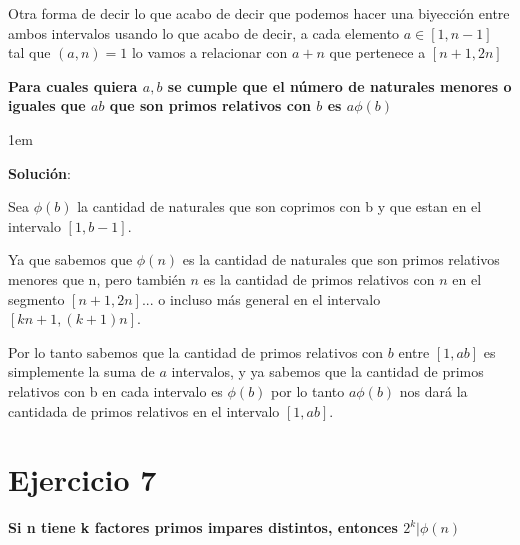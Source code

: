 \documentclass[12pt, fleqn]{article}                             %
\newenvironment{SmallIndentation}[1][0.75em]                    %
    {\begin{adjustwidth}{#1}{}\begin{footnotesize}}                 %
    {\end{footnotesize}\end{adjustwidth}}                           %
\begin{document}
        Otra forma de decir lo que acabo de decir que podemos hacer una biyección entre ambos
        intervalos usando lo que acabo de decir, a cada elemento $a \in [1, n-1]$ tal que $(a, n) = 1$
        lo vamos a relacionar con $a+n$ que pertenece a $[n+1, 2n]$

    \textbf{Para cuales quiera $a, b$ se cumple que el número de naturales menores o iguales que $ab$
    que son primos relativos con $b$ es $a \phi(b)$}

    \begin{SmallIndentation}[1em]
        \textbf{Solución}:
        
        Sea $\phi(b)$ la cantidad de naturales que son coprimos con b y que estan en el intervalo
        $[1, b-1]$.

        Ya que sabemos que $\phi(n)$ es la cantidad de naturales que son primos relativos menores
        que n, pero también $n$ es la cantidad de primos relativos con $n$ en el
        segmento $[n+1, 2n]$... o incluso más general en el intervalo $[kn+1, (k+1)n]$.

        Por lo tanto sabemos que la cantidad de primos relativos con $b$ entre $[1, ab]$ es
        simplemente la suma de $a$ intervalos, y ya sabemos que la cantidad de primos relativos
        con b en cada intervalo es $\phi(b)$ por lo tanto $a\phi(b)$ nos dará la cantidada de
        primos relativos en el intervalo $[1, ab]$.
    
    \end{SmallIndentation}



\clearpage
\section{Ejercicio 7}

    \textbf{Si n tiene k factores primos impares distintos, entonces $2^k|\phi(n)$}
\end{document}
